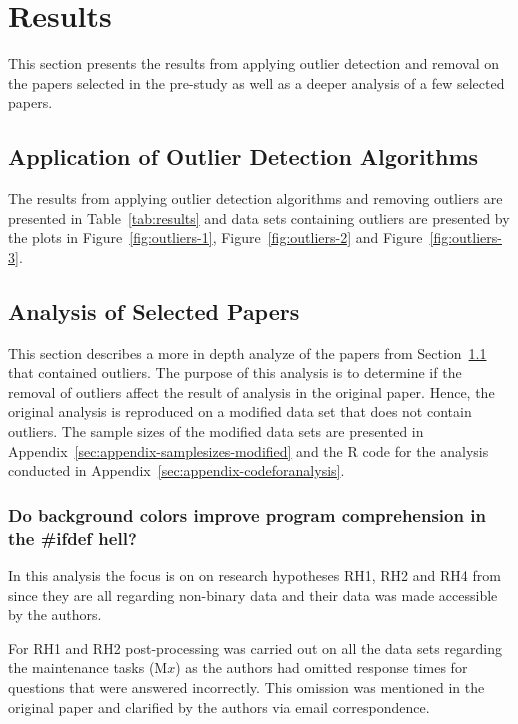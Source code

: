 ﻿\section{Results}
\label{sec:results}
This section presents the results from applying outlier detection and removal on the papers selected in the pre-study as well as a deeper analysis of a few selected papers.


\subsection{Application of Outlier Detection Algorithms}
\label{sec:results-application}
The results from applying outlier detection algorithms and removing outliers are presented in Table~\ref{tab:results} and data sets containing outliers are presented by the plots in Figure~\ref{fig:outliers-1}, Figure~\ref{fig:outliers-2} and Figure~\ref{fig:outliers-3}.








\subsection{Analysis of Selected Papers}
\label{sec:results-papers}
This section describes a more in depth analyze of the papers from Section~\ref{sec:results-application} that contained outliers. The purpose of this analysis is to determine if the removal of outliers affect the result of analysis in the original paper. Hence, the original analysis is reproduced on a modified data set that does not contain outliers. The sample sizes of the modified data sets are presented in Appendix~\ref{sec:appendix-samplesizes-modified} and the \textsf{R} code for the analysis conducted in Appendix~\ref{sec:appendix-codeforanalysis}.




\subsubsection{Do background colors improve program comprehension in the \#ifdef hell?}
In this analysis the focus is on on research hypotheses RH1, RH2 and RH4 from \citep{feigenspan2013background} since they are all regarding non-binary data and their data was made accessible by the authors.




For RH1 and RH2 post-processing was carried out on all the data sets regarding the maintenance tasks (M$x$) as the authors had omitted response times for questions that were answered incorrectly. This omission was mentioned in the original paper and clarified by the authors via email correspondence.




